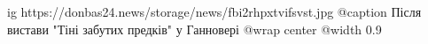  
 
 
 
 

\ifcmt
  ig https://donbas24.news/storage/news/fbi2rhpxtvifsvst.jpg
	@caption Після вистави "Тіні забутих предків" у Ганновері
  @wrap center
  @width 0.9
\fi
